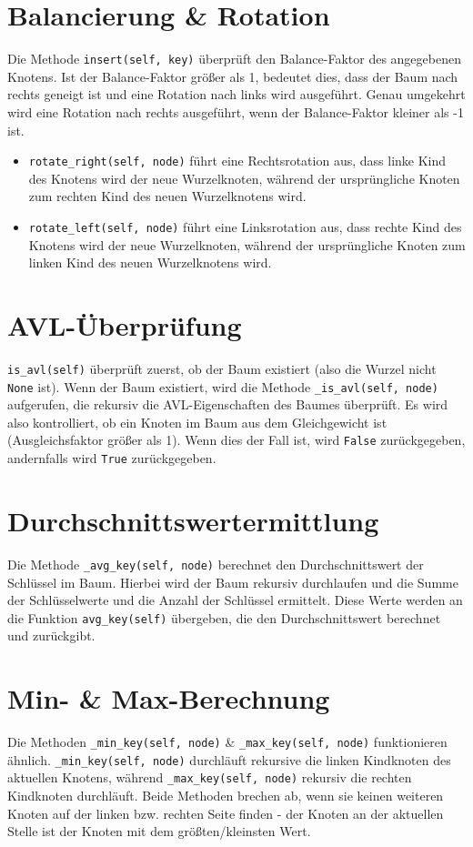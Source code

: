 \documentclass{article}
\begin{document}
\section*{Balancierung \& Rotation}
Die Methode \texttt{insert(self, key)} überprüft den Balance-Faktor des angegebenen Knotens. Ist der Balance-Faktor größer als 1, bedeutet dies, dass der Baum nach rechts geneigt ist und
eine Rotation nach links wird ausgeführt. Genau umgekehrt wird eine Rotation nach rechts ausgeführt, wenn der Balance-Faktor kleiner als -1 ist.
\begin{itemize}
    \item \texttt{rotate\_right(self, node)} führt eine Rechtsrotation aus, dass linke Kind des Knotens wird der neue Wurzelknoten, während der ursprüngliche Knoten zum rechten Kind des neuen Wurzelknotens wird.
    \item \texttt{rotate\_left(self, node)} führt eine Linksrotation aus, dass rechte Kind des Knotens wird der neue Wurzelknoten, während der ursprüngliche Knoten zum linken Kind des neuen Wurzelknotens wird.
\end{itemize}

\section*{AVL-Überprüfung}
\texttt{is\_avl(self)} überprüft zuerst, ob der Baum existiert (also die Wurzel nicht \texttt{None} ist). Wenn der Baum existiert, wird die Methode \texttt{\_is\_avl(self, node)} aufgerufen, die rekursiv die AVL-Eigenschaften des Baumes überprüft.
Es wird also kontrolliert, ob ein Knoten im Baum aus dem Gleichgewicht ist (Ausgleichsfaktor größer als 1). Wenn dies der Fall ist, wird \texttt{False} zurückgegeben, andernfalls wird \texttt{True} zurückgegeben.

\section*{Durchschnittswertermittlung}
Die Methode \texttt{\_avg\_key(self, node)} berechnet den Durchschnittswert der Schlüssel im Baum. Hierbei wird der Baum rekursiv durchlaufen und die Summe der Schlüsselwerte und die Anzahl der Schlüssel ermittelt.
Diese Werte werden an die Funktion \texttt{avg\_key(self)} übergeben, die den Durchschnittswert berechnet und zurückgibt.

\section*{Min- \& Max-Berechnung}
Die Methoden \texttt{\_min\_key(self, node)} \& \texttt{\_max\_key(self, node)} funktionieren ähnlich. \texttt{\_min\_key(self, node)} durchläuft rekursive die linken Kindknoten des aktuellen Knotens, während \texttt{\_max\_key(self, node)}
rekursiv die rechten Kindknoten durchläuft. Beide Methoden brechen ab, wenn sie keinen weiteren Knoten auf der linken bzw. rechten Seite finden - der Knoten an der aktuellen Stelle ist der Knoten mit dem größten/kleinsten Wert.
\end{document}
